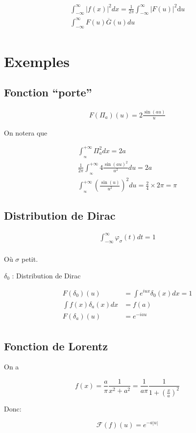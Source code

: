\documentclass[a4paper,11pt]{article}
\begin{document}
\begin{align*}
  \int_{-\infty}^{\infty} |f(x)|^2 dx = \frac{1}{2\pi} \int_{-\infty}^{\infty} |F(u)|^2 \mathrm{d}u\\
  \int_{-\infty}^{\infty} F(u)\overline{G}(u) du\\ %
\end{align*}

\section{Exemples}

\subsection{Fonction ``porte''}

\begin{align*}
  F(\Pi_a)(u) = 2 \frac{\sin(au)}{u}
\end{align*}

On notera que

\begin{align*}
  \int^{+\infty}_{_\infty} \Pi_a^2 dx = 2a \\
  \frac{1}{2\pi} \int^{+\infty}_{_\infty} 4 \frac{\sin(au)^2}{u^2} du = 2a \\
  \int^{+\infty}_{_\infty} \left( \frac{\sin(u)}{u^2} \right) ^2 du = \frac{2}{4} \times 2 \pi = \pi
\end{align*}

\subsection{Distribution de Dirac}
\begin{align*}
  \int_{-\infty}^{\infty} \varphi_\sigma(t)dt = 1\\
\end{align*}

Où $\sigma$ petit.

$\delta_0 $ : Distribution de Dirac

\begin{align*}
  F(\delta_0)(u) &= \int e^{iux} \delta_0(x)dx = 1\\
  \int f(x)\delta_a(x)dx &= f(a)\\
  F(\delta_a)(u) &= e^{-iau}\\
\end{align*}

\subsection{Fonction de Lorentz}

On a

$$ f(x) = \frac{a}{\pi} \frac{1}{x^2 + a^2} = \frac{1}{a \pi} \frac{1}{1 + \left(\frac{x}{a} \right) ^2 }$$

Donc:

$$ \mathcal{F}(f)(u) = e^{-a|u|} $$
\end{document}
